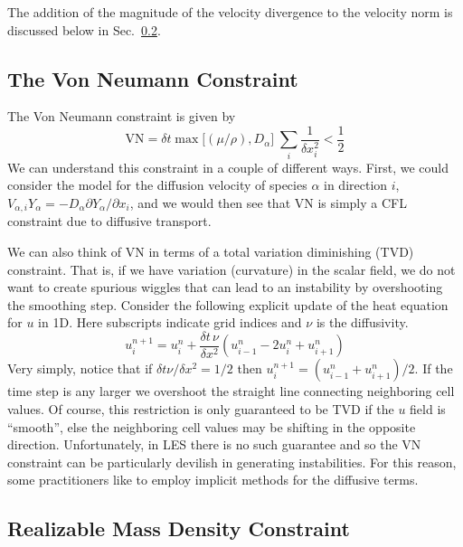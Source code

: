 The addition of the magnitude of the velocity divergence to the velocity norm is discussed below in Sec.~\ref{sec:mass_density_constraint}.

\subsection{The Von Neumann Constraint}

The Von Neumann constraint is given by
\begin{equation}
\mbox{VN} = \delta t \max \big[(\mu/\rho),D_\alpha \big] \; \sum_i \frac{1}{\delta x_i^2} < \frac{1}{2}
\end{equation}
We can understand this constraint in a couple of different ways.  First, we could consider the model for the diffusion velocity of species $\alpha$ in direction $i$, $V_{\alpha,i}Y_\alpha = -D_\alpha \partial Y_\alpha/\partial x_i$, and we would then see that VN is simply a CFL constraint due to diffusive transport.

We can also think of VN in terms of a total variation diminishing (TVD) constraint.  That is, if we have variation (curvature) in the scalar field, we do not want to create spurious wiggles that can lead to an instability by overshooting the smoothing step.  Consider the following explicit update of the heat equation for $u$ in 1D. Here subscripts indicate grid indices and $\nu$ is the diffusivity.
\begin{equation}
u_i^{n+1} = u_i^n + \frac{\delta t \, \nu}{\delta x^2} \left( u_{i-1}^n - 2u_i^n + u_{i+1}^n \right)
\end{equation}
Very simply, notice that if $\delta t \nu/\delta x^2 = 1/2$ then $u_i^{n+1} = (u_{i-1}^n + u_{i+1}^n)/2$.  If the time step is any larger we overshoot the straight line connecting neighboring cell values.  Of course, this restriction is only guaranteed to be TVD if the $u$ field is ``smooth'', else the neighboring cell values may be shifting in the opposite direction.  Unfortunately, in LES there is no such guarantee and so the VN constraint can be particularly devilish in generating instabilities. For this reason, some practitioners like to employ implicit methods for the diffusive terms.

\subsection{Realizable Mass Density Constraint}
\label{sec:mass_density_constraint}

